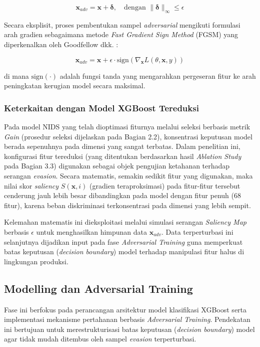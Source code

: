 \documentclass[11pt, a4paper]{article}
\begin{document}
\begin{equation}
\mathbf{x}_{adv} = \mathbf{x} + \boldsymbol{\delta}, \quad \text{dengan } \|\boldsymbol{\delta}\|_\infty \le \epsilon
\end{equation}

Secara eksplisit, proses pembentukan sampel \textit{adversarial} mengikuti formulasi arah gradien sebagaimana metode \textit{Fast Gradient Sign Method} (FGSM) yang diperkenalkan oleh Goodfellow dkk. \cite{ref_fgsm}:

\begin{equation}
\mathbf{x}_{adv} = \mathbf{x} + \epsilon \cdot \text{sign}\left( \nabla_{\mathbf{x}} L(\theta, \mathbf{x}, y) \right)
\end{equation}

di mana $\text{sign}(\cdot)$ adalah fungsi tanda yang mengarahkan pergeseran fitur ke arah peningkatan kerugian model secara maksimal.

\subsubsection{Keterkaitan dengan Model XGBoost Tereduksi}
Pada model NIDS yang telah dioptimasi fiturnya melalui seleksi berbasis metrik \textit{Gain} (prosedur seleksi dijelaskan pada Bagian 2.2), konsentrasi keputusan model berada sepenuhnya pada dimensi yang sangat terbatas. Dalam penelitian ini, konfigurasi fitur tereduksi (yang ditentukan berdasarkan hasil \textit{Ablation Study} pada Bagian 3.3) digunakan sebagai objek pengujian ketahanan terhadap serangan \textit{evasion}. Secara matematis, semakin sedikit fitur yang digunakan, maka nilai skor \textit{saliency} $S(\mathbf{x}, i)$ (gradien teraproksimasi) pada fitur-fitur tersebut cenderung jauh lebih besar dibandingkan pada model dengan fitur penuh ($68$ fitur), karena beban diskriminasi terkonsentrasi pada dimensi yang lebih sempit.

Kelemahan matematis ini dieksploitasi melalui simulasi serangan \textit{Saliency Map} berbasis $\epsilon$ untuk menghasilkan himpunan data $\mathbf{x}_{adv}$. Data terperturbasi ini selanjutnya dijadikan input pada fase \textit{Adversarial Training} guna memperkuat batas keputusan (\textit{decision boundary}) model terhadap manipulasi fitur halus di lingkungan produksi.


\subsection{Modelling dan Adversarial Training}
Fase ini berfokus pada perancangan arsitektur model klasifikasi XGBoost serta implementasi mekanisme pertahanan berbasis \textit{Adversarial Training}. Pendekatan ini bertujuan untuk merestrukturisasi batas keputusan (\textit{decision boundary}) model agar tidak mudah ditembus oleh sampel \textit{evasion} terperturbasi.
\end{document}
